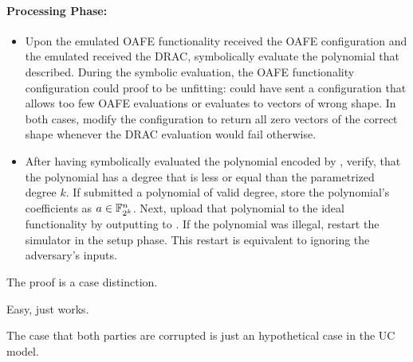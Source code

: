 \paragraph{Processing Phase:}

\begin{itemize}

  \item Upon the emulated OAFE functionality received the OAFE configuration and
    the emulated \JWpTwo{} received the DRAC, symbolically evaluate the
    polynomial that \JWadv{} described. During the symbolic evaluation, the OAFE
    functionality configuration could proof to be unfitting: \JWadv{} could
    have sent a configuration that allows too few OAFE evaluations or evaluates
    to vectors of wrong shape. In both cases, modify the configuration to return
    all zero vectors of the correct shape whenever the DRAC evaluation would
    fail otherwise.

  \item After having symbolically evaluated the polynomial encoded by \JWadv{},
    verify, that the polynomial has a degree that is less or equal than the
    parametrized degree $k$. If \JWadv{} submitted a polynomial of valid degree,
    store the polynomial's coefficients as $a \in \mathbb{F}_{2^k}^n$.  Next,
    upload that polynomial to the ideal functionality \JWfuncSymOPEnp{} by
    outputting  to \JWfuncSymOPEnp{}.  If the polynomial
    was illegal, restart the simulator in the setup phase.  This restart is
    equivalent to ignoring the adversary's inputs.

\end{itemize}


%
%
\label{sec:proof}

The proof is a case distinction.




Easy, just works.





The case that both parties are corrupted is just an hypothetical case in the UC
model.




